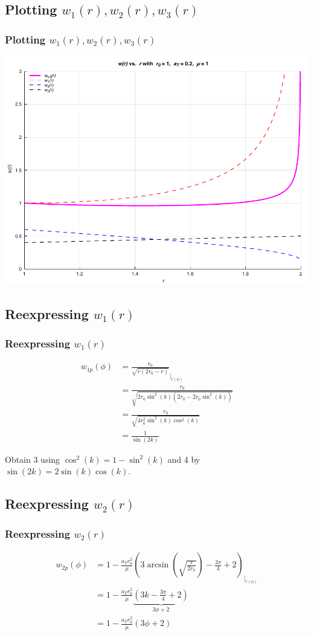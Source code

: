 \documentclass{beamer}
\newcommand{\sectit}[1]{
    \section{\texorpdfstring{#1}{}}
    \frametitle{\texorpdfstring{#1}{}}
}
\begin{document}
\begin{frame}
    \sectit{Plotting $w_1(r),w_2(r),w_3(r)$}

    \begin{center}
        \includegraphics[scale=0.7]{../plots/partA_r.pdf}
    \end{center}
\end{frame}

\begin{frame}
    \sectit{Reexpressing $w_1(r)$}

    \begin{align}
        w_{1p}(\phi)&=\frac{r_{0}}{\sqrt{r\left(2 r_{0}-r\right)}}_{\big\rvert_{r(\phi)}}\\
        &=\frac{r_0}{\sqrt{2r_0\sin^2(k)(2r_0-2r_0\sin^2(k))}}\\
        &=\frac{r_0}{\sqrt{4r_0^2\sin^2(k)\cos^2(k)}}\\
        &=\frac{1}{\sin(2k)}
    \end{align}

    Obtain 3 using $\cos^2(k)=1-\sin^2(k)$ and 4 by $\sin(2k)=2\sin(k)\cos(k)$.
    
\end{frame}

\begin{frame}
    \sectit{Reexpressing $w_2(r)$}

    \begin{align}
        w_{2p}(\phi)&=1-\frac{a_Tr_0^2}{\mu}\left(3\arcsin(\sqrt{\frac{r}{2r_0}})-\frac{3\pi}{4}+2\right)_{\big\rvert_{r(\phi)}}\\
        &=1-\frac{a_Tr_0^2}{\mu}\underbrace{\left(3k-\frac{3\pi}{4}+2\right)}_{3\phi + 2}\\
        &=1-\frac{a_Tr_0^2}{\mu}\left(3\phi+2\right)
    \end{align}
\end{frame}
\end{document}
